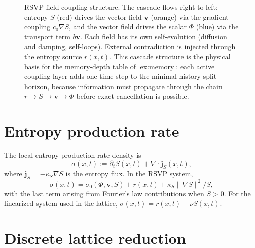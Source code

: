 \documentclass[12pt, oneside]{memoir}
\newcommand{\nnorm}[1]{\lVert #1 \rVert}
\newcommand{\bv}{\mathbf{v}}
\begin{document}
\begin{figure}[htbp]
\caption{RSVP field coupling structure.  The cascade flows right to left: entropy $S$
(red) drives the vector field $\mathbf{v}$ (orange) via the gradient coupling $c_0\nabla
S$, and the vector field drives the scalar $\Phi$ (blue) via the transport term $b\mathbf{v}$.
Each field has its own self-evolution (diffusion and damping, self-loops).  External
contradiction is injected through the entropy source $r(x,t)$.  This cascade structure
is the physical basis for the memory-depth table of \cref{ex:memory}: each active
coupling layer adds one time step to the minimal history-split horizon, because
information must propagate through the chain $r \to S \to \mathbf{v} \to \Phi$ before
exact cancellation is possible.}
\label{fig:rsvp-coupling}
\end{figure}

\section{Entropy production rate}

\begin{definition}
\label{def:sigma}
The local entropy production rate density is
\[
  \sigma(x,t) := \partial_t S(x,t) + \nabla \cdot \mathbf{j}_S(x,t),
\]
where $\mathbf{j}_S = -\kappa_S \nabla S$ is the entropy flux.  In the RSVP system,
\[
  \sigma(x,t) = \sigma_0(\Phi,\bv,S) + r(x,t) + \kappa_S \nnorm{\nabla S}^2 / S,
\]
with the last term arising from Fourier's law contributions when $S > 0$.  For the
linearized system used in the lattice, $\sigma(x,t) = r(x,t) - \nu S(x,t)$.
\end{definition}

\section{Discrete lattice reduction}
\end{document}
